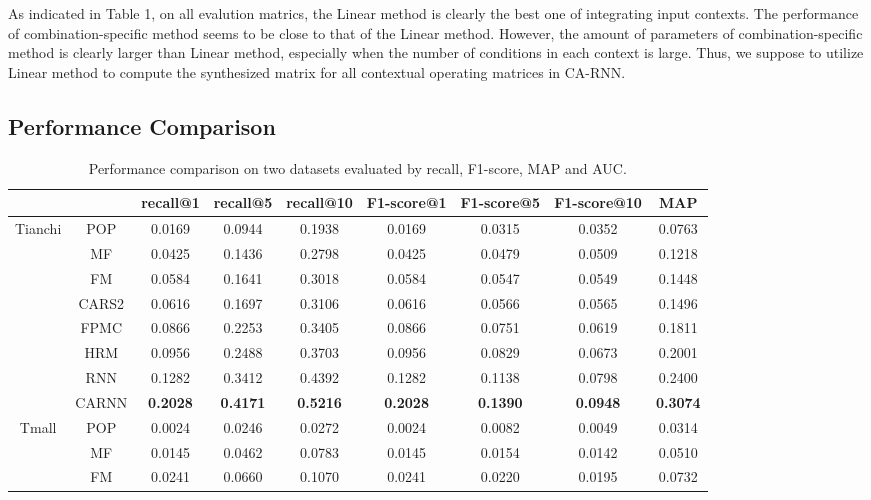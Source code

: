 \documentclass[conference]{IEEEtran}
\begin{document}
As indicated in Table 1, on all evalution matrics, the Linear method is clearly the best one of integrating input contexts. The performance of combination-specific method seems to be close to that of the Linear method. However, the amount of parameters of combination-specific method is clearly larger than Linear method, especially when the number of conditions in each context is large.
Thus, we suppose to utilize Linear method to compute the synthesized matrix for all contextual operating matrices in CA-RNN.


\subsection{Performance Comparison}

\begin{table}[htbp]
\centering\scriptsize
\caption{Performance comparison on two datasets evaluated by recall, F1-score, MAP and AUC.}
\begin{tabular}{ccccccccc}
    \toprule
          &       & recall@1 & recall@5 & recall@10 & F1-score@1 & F1-score@5 & F1-score@10 & MAP   \\
    \midrule
    \multirow{8}[0]{*}{Tianchi} 
        & POP   &0.0169    &0.0944  &0.1938  &0.0169  &0.0315  &0.0352  &0.0763 \\
        & MF    &0.0425   & 0.1436  &0.2798&  0.0425  &0.0479 & 0.0509  &0.1218 \\
        & FM   &0.0584  &0.1641  &0.3018 & 0.0584  &0.0547 & 0.0549 & 0.1448 \\
        & CARS2   &0.0616 & 0.1697  &0.3106 & 0.0616 & 0.0566 & 0.0565 & 0.1496\\
        & FPMC    &0.0866  &0.2253  &0.3405  &0.0866  &0.0751  &0.0619  &0.1811 \\
        & HRM   &0.0956  &0.2488 & 0.3703 & 0.0956 & 0.0829&  0.0673&  0.2001 \\
        & RNN   &0.1282  &0.3412&  0.4392&  0.1282 & 0.1138 &0.0798 & 0.2400 \\
        & CARNN    &\textbf{0.2028}  &\textbf{0.4171}  &\textbf{0.5216}&  \textbf{0.2028}&  \textbf{0.1390}&\textbf{ 0.0948}  &\textbf{0.3074} \\
    \midrule
    \multirow{8}[0]{*}{Tmall} 
        & POP   &0.0024  &0.0246  & 0.0272  & 0.0024   &0.0082  & 0.0049   &0.0314 \\
        & MF    & 0.0145  & 0.0462  & 0.0783  &0.0145   &0.0154   &0.0142   &0.0510 \\
        & FM   & 0.0241  &0.0660  & 0.1070   &0.0241   &0.0220  & 0.0195  & 0.0732 \\

\end{tabular}
\end{table}
\end{document}
